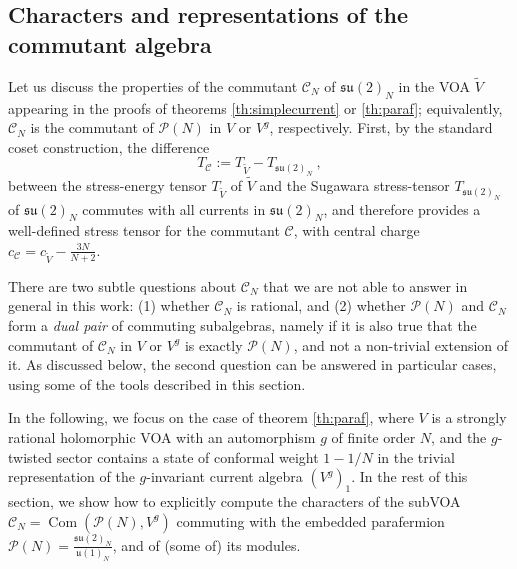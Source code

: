 \documentclass[11pt,reqno]{article}
\newcommand{\be}{\begin{equation}}
\newcommand{\ee}{\end{equation}}
\newcommand{\calC}{\mathcal{C}}
\DeclareMathOperator{\Com}{Com}
\newcommand{\paraf}{\mathcal{P}}
\newcommand{\alg}[1]{\mathfrak{#1}}
\begin{document}
\subsection{Characters and representations of the commutant algebra}\label{s:commutant}

Let us discuss the properties of the commutant $\mathcal{C}_N$ of $\alg{su}(2)_N$ in the VOA $\tilde V$ appearing in the proofs of theorems \ref{th:simplecurrent} or \ref{th:paraf}; equivalently, $\mathcal{C}_N$ is the commutant of $\paraf(N)$ in $V$ or $V^g$, respectively. First, by the standard coset construction, the difference
\be T_\mathcal{C}:=T_{\tilde V}-T_{\mathfrak{su}(2)_N}\ ,
\ee between the stress-energy tensor $T_{\tilde V}$ of $\tilde V$ and the Sugawara stress-tensor $T_{\mathfrak{su}(2)_N}$ of $\alg{su}(2)_N$ commutes with all currents in $\mathfrak{su}(2)_N$, and therefore provides a well-defined stress tensor for the commutant $\mathcal{C}$, with central charge $c_\mathcal{C}= c_{\tilde V}-\frac{3N}{N+2}$.

There are two subtle questions about $\calC_N$ that we are not able to answer in general in this work: (1) whether $\calC_N$ is rational, and (2) whether $\paraf(N)$ and $\calC_N$ form a \emph{dual pair} of commuting subalgebras, namely if it is also true that the commutant of $\calC_N$ in $V$ or $V^g$ is exactly $\paraf(N)$, and not a non-trivial extension of it. As discussed below, the second question can be answered in particular cases, using some of the tools described in this section.


In the following, we focus on the case of theorem \ref{th:paraf}, where $V$ is  a strongly rational holomorphic VOA with an automorphism $g$ of finite order $N$, and the $g$-twisted sector contains a state of conformal weight $1-1/N$ in the trivial representation of the $g$-invariant current algebra $(V^g)_1$. In the rest of this section, we show how to explicitly compute the characters of the subVOA $\mathcal{C}_N=\Com(\paraf(N),V^g)$ commuting with the embedded parafermion $\paraf(N)=\frac{\alg{su}(2)_N}{\alg{u}(1)_N}$, and of (some of) its modules.
\end{document}
